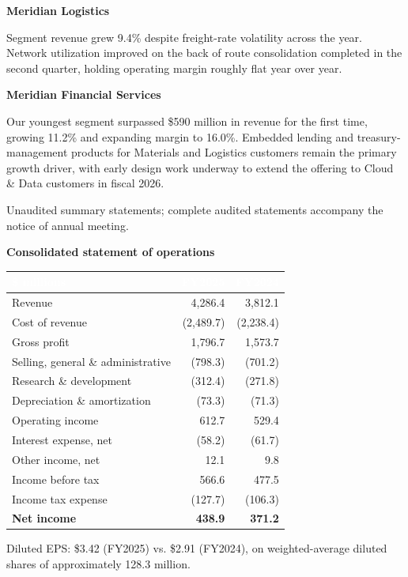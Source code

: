 \documentclass[11pt,oneside,a4paper]{scrbook}
\newcommand{\goldrule}{\noindent{\color{merGold}\rule{\linewidth}{1.1pt}}\par\vspace{2pt}\noindent{\color{merNavy!25}\rule{\linewidth}{0.4pt}}\vspace{10pt}\par}
\newcommand{\sectionlede}[1]{{\color{merSlate}\large #1}\par\vspace{6pt}}
\begin{document}
{\bfseries\color{merNavy} Meridian Logistics}\par
Segment revenue grew 9.4\% despite freight-rate volatility across the year. Network utilization improved on the back of route consolidation completed in the second quarter, holding operating margin roughly flat year over year.

{\bfseries\color{merNavy} Meridian Financial Services}\par
Our youngest segment surpassed \$590 million in revenue for the first time, growing 11.2\% and expanding margin to 16.0\%. Embedded lending and treasury-management products for Materials and Logistics customers remain the primary growth driver, with early design work underway to extend the offering to Cloud \& Data customers in fiscal 2026.

\goldrule

\sectionlede{Unaudited summary statements; complete audited statements accompany the notice of annual meeting.}

{\bfseries\color{merNavy} Consolidated statement of operations}\par
\vspace{4pt}
\begin{tabular}{lrr}
\toprule
\rowcolor{merNavy}
\textcolor{white}{\bfseries \$ millions} & \textcolor{white}{\bfseries FY2025} & \textcolor{white}{\bfseries FY2024} \\
\midrule
Revenue & 4,286.4 & 3,812.1 \\
Cost of revenue & (2,489.7) & (2,238.4) \\
\midrule
Gross profit & 1,796.7 & 1,573.7 \\
Selling, general \& administrative & (798.3) & (701.2) \\
Research \& development & (312.4) & (271.8) \\
Depreciation \& amortization & (73.3) & (71.3) \\
\midrule
Operating income & 612.7 & 529.4 \\
Interest expense, net & (58.2) & (61.7) \\
Other income, net & 12.1 & 9.8 \\
\midrule
Income before tax & 566.6 & 477.5 \\
Income tax expense & (127.7) & (106.3) \\
\midrule
\rowcolor{merPaper}
\textbf{Net income} & \textbf{438.9} & \textbf{371.2} \\
\bottomrule
\end{tabular}
\par\vspace{4pt}
{\footnotesize\color{merSlate} Diluted EPS: \$3.42 (FY2025) vs. \$2.91 (FY2024), on weighted-average diluted shares of approximately 128.3 million.}
\end{document}
